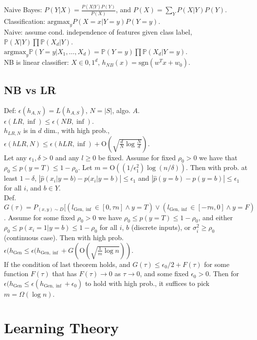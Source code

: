 Naive Bayes: $P(Y|X)=\frac{P(X|Y)P(Y)}{P(X)}$, and $P(X) = \sum_Y P(X|Y)P(Y)$.\\
Classification: $\text{argmax}_y P(X=x|Y=y)P(Y=y)$.\\
Naive: assume cond. independence of features given class label, $\mathbb{P}(X|Y) \prod \mathbb{P}(X_d|Y)$.\\
$\text{argmax}_y \mathbb{P}(Y=y|X_1, \dots, X_d) = \mathbb{P}(Y=y) \prod \mathbb{P}(X_d|Y=y)$.\\
NB is linear classifier: $X \in {0, 1}^d$, $h_{NB}(x) = \text{sgn}(w^T x + w_0)$.

\subsection*{NB vs LR}

Def: $\epsilon(h_{A, N}) = L(h_{A, S})$, $N = |S|$, algo. $A$.\\
$\epsilon(LR, \inf) \leq \epsilon(NB, \inf)$.\\
$h_{LR, N}$ is in $d$ dim., with high prob., $\epsilon(h{LR, N}) \leq \epsilon(h{LR, \inf}) + \text{O}(\sqrt{\frac{d}{N}\log\frac{N}{d}})$.\\
Let any $\epsilon_1, \delta > 0$ and any $l \geq 0$ be fixed. Assume for fixed $\rho_0 > 0$ we have that $\rho_0 \leq p(y=T) \leq 1-\rho_0$. Let $m=\text{O}((1/\epsilon_1^2)\log(n/\delta))$. Then with prob. at least $1-\delta$, $|\hat{p}(x_i|y=b)-p(x_i|y=b)|\leq \epsilon_1$ and $|\hat{p}(y=b)-p(y=b)|\leq \epsilon_1$ for all $i$, and $b \in Y$.\\
Def. $G(\tau) = P_{(x, y) \sim D}[(l_{\text{Gen}, \inf}\in [0, \tau n]\wedge y=T) \vee (l_{\text{Gen}, \inf}\in [-\tau n, 0] \wedge y=F)$. Assume for some fixed $\rho_0 > 0$ we have $\rho_0 \leq p(y=T) \leq 1-\rho_0$, and either $\rho_0 \leq p(x_i=1|y=b) \leq 1-\rho_0$ for all $i$, $b$ (discrete inputs), or $\sigma_i^2 \geq \rho_0$ (continuous case). Then with high prob. $\epsilon(h_{\text{Gen}} \leq \epsilon(h_{\text{Gen}, \inf} + G(\text{O}(\sqrt{\frac{1}{m}\log n}))$.\\
If the condition of last theorem holds, and $G(\tau) \leq \epsilon_0 / 2 + F(\tau)$ for some function $F(\tau)$ that has $F(\tau) \rightarrow 0$ as $\tau \rightarrow 0$, and some fixed $\epsilon_0 > 0$. Then for $\epsilon(h_{\text{Gen}} \leq \epsilon(h_{\text{Gen}, \inf} + \epsilon_0)$ to hold with high prob., it suffices to pick $m = \Omega(\log n)$.

\section{Learning Theory}

